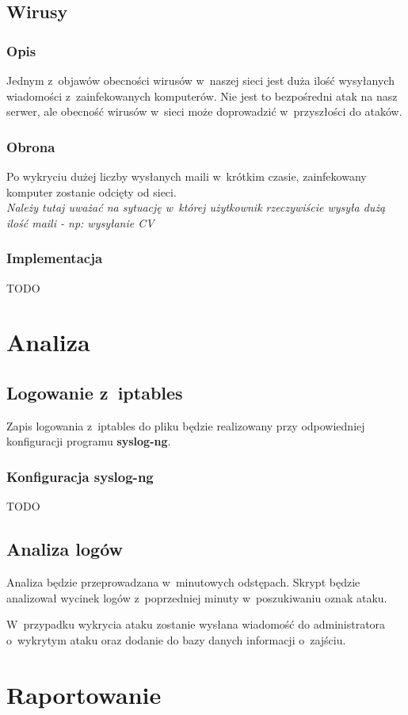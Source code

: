 \documentclass[a4paper,10pt]{article}
\begin{document}
	\subsection{Wirusy}
		\subsubsection{Opis}
			Jednym z~objawów obecności wirusów w~naszej sieci jest duża ilość wysyłanych wiadomości z~zainfekowanych komputerów. Nie jest to bezpośredni atak na nasz serwer, ale obecność wirusów w~sieci może doprowadzić w~przyszłości do ataków.
		\subsubsection{Obrona}
			Po wykryciu dużej liczby wysłanych maili w~krótkim czasie, zainfekowany komputer zostanie odcięty od sieci.\\
			\textit{Należy tutaj uważać na sytuację w~której użytkownik rzeczywiście wysyła dużą ilość maili - np: wysyłanie CV}
		\subsubsection{Implementacja}
			TODO
\section{Analiza}
	\subsection{Logowanie z~iptables}
		Zapis logowania z~iptables do pliku będzie realizowany przy odpowiedniej konfiguracji programu \textbf{syslog-ng}.
		\subsubsection{Konfiguracja syslog-ng}
			TODO
	\subsection{Analiza logów}
		Analiza będzie przeprowadzana w~minutowych odstępach. Skrypt będzie analizował wycinek logów z~poprzedniej minuty w~poszukiwaniu oznak ataku.
		
		W~przypadku wykrycia ataku zostanie wysłana wiadomość do administratora o~wykrytym ataku oraz dodanie do bazy danych informacji o~zajściu.
\section{Raportowanie}
\end{document}
